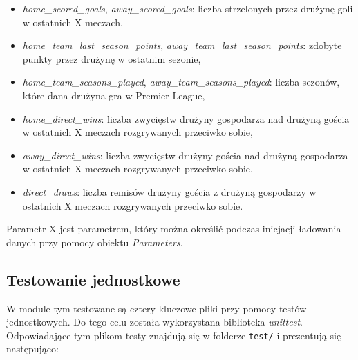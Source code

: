 \begin{itemize}
            \item \emph{home\_scored\_goals}, \emph{away\_scored\_goals}: liczba strzelonych przez drużynę goli w ostatnich X meczach, 
            \item \emph{home\_team\_last\_season\_points}, \emph{away\_team\_last\_season\_points}: zdobyte punkty przez drużynę w ostatnim sezonie, 
            \item \emph{home\_team\_seasons\_played}, \emph{away\_team\_seasons\_played}: liczba sezonów, które dana drużyna gra w Premier League, 
            \item \emph{home\_direct\_wins}: liczba zwycięstw drużyny gospodarza nad drużyną gościa w ostatnich X meczach rozgrywanych przeciwko sobie,
            \item \emph{away\_direct\_wins}: liczba zwycięstw drużyny gościa nad drużyną gospodarza w ostatnich X meczach rozgrywanych przeciwko sobie, 
            \item \emph{direct\_draws}: liczba remisów drużyny gościa z drużyną gospodarzy w ostatnich X meczach rozgrywanych przeciwko sobie. 
        \end{itemize}   
        
        Parametr X jest parametrem, który można określić podczas inicjacji ładowania danych przy pomocy obiektu \emph{Parameters}.
        
        \subsection{Testowanie jednostkowe}
        \noindent W module tym testowane są cztery kluczowe pliki przy pomocy testów jednostkowych. Do tego celu została wykorzystana biblioteka \emph{unittest}. Odpowiadające tym plikom testy znajdują się w folderze \texttt{test/} i prezentują się następująco:
        
